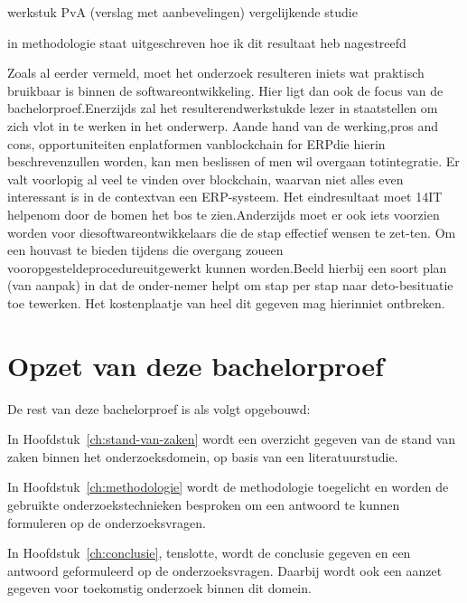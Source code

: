 werkstuk
PvA (verslag met aanbevelingen)
vergelijkende studie

in methodologie staat uitgeschreven hoe ik dit resultaat heb nagestreefd

Zoals al eerder vermeld, moet het onderzoek resulteren iniets wat praktisch bruikbaar is binnen de softwareontwikkeling. Hier ligt dan ook de focus van de bachelorproef.Enerzijds zal het resulterendwerkstukde lezer in staatstellen om zich vlot in te werken in het onderwerp. Aande hand van de werking,pros and cons, opportuniteiten enplatformen vanblockchain for ERPdie hierin beschrevenzullen worden, kan men beslissen of men wil overgaan totintegratie. Er valt voorlopig al veel te vinden over blockchain, waarvan niet alles even interessant is in de contextvan een ERP-systeem. Het eindresultaat moet 14IT helpenom door de bomen het bos te zien.Anderzijds moet er ook iets voorzien worden voor diesoftwareontwikkelaars die de stap effectief wensen te zet-ten. Om een houvast te bieden tijdens die overgang zoueen vooropgesteldeprocedureuitgewerkt kunnen worden.Beeld hierbij een soort plan (van aanpak) in dat de onder-nemer helpt om stap per stap naar deto-besituatie toe tewerken. Het kostenplaatje van heel dit gegeven mag hierinniet ontbreken.




\section{Opzet van deze bachelorproef}
\label{sec:opzet-bachelorproef}


De rest van deze bachelorproef is als volgt opgebouwd:

In Hoofdstuk~\ref{ch:stand-van-zaken} wordt een overzicht gegeven van de stand van zaken binnen het onderzoeksdomein, op basis van een literatuurstudie.

In Hoofdstuk~\ref{ch:methodologie} wordt de methodologie toegelicht en worden de gebruikte onderzoekstechnieken besproken om een antwoord te kunnen formuleren op de onderzoeksvragen.


In Hoofdstuk~\ref{ch:conclusie}, tenslotte, wordt de conclusie gegeven en een antwoord geformuleerd op de onderzoeksvragen. Daarbij wordt ook een aanzet gegeven voor toekomstig onderzoek binnen dit domein.